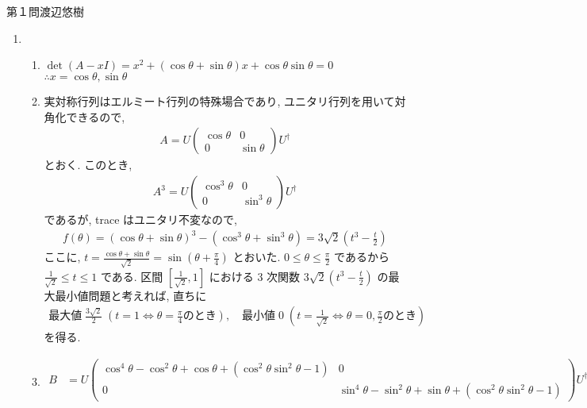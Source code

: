 \def\Tr{\mathop{\mathrm{Tr}}}
\begin{answer}{第１問}{渡辺悠樹}
\begin{enumerate}
\item
  \begin{enumerate}
  \item
    $\det(A-xI) = x^2+ (\cos\theta + \sin\theta)x + \cos\theta\sin\theta = 0$
    $\therefore x = \cos\theta,\sin\theta$
  \item
    実対称行列はエルミート行列の特殊場合であり, ユニタリ行列を用いて対角化できるので,
    \begin{align*}
      A=U\begin{pmatrix}\cos\theta & 0 \\ 0 & \sin\theta\end{pmatrix}U^\dag
    \end{align*}
    とおく. このとき, 
    \begin{align*}
      A^3=U\begin{pmatrix}\cos^3\theta & 0 \\ 0 & \sin^3\theta\end{pmatrix}U^\dag
    \end{align*}
    であるが, trace はユニタリ不変なので,
    \begin{align*}
      f(\theta) =(\cos\theta +\sin\theta)^3 - (\cos^3\theta+\sin^3\theta) =3\sqrt2(t^3-\frac t2)
    \end{align*}
    ここに, $t =\frac{\cos\theta + \sin\theta}{\sqrt2} = \sin\left(\theta +\frac\pi4\right)$
    とおいた. $0\le\theta\le\frac\pi2$
    であるから $\frac1{\sqrt2}\le t\le 1$ である. 区間 $[\frac{1}{\sqrt2}, 1]$ における
    3 次関数 $3\sqrt2(t^3-\frac t2)$ の最大最小値問題と考えれば, 直ちに
    \begin{align*}
      最大値\; \frac{3\sqrt2}{2}\; (t=1 \Leftrightarrow \theta =\frac\pi4 のとき),\quad
      最小値\; 0\; (t=\frac1{\sqrt2} \Leftrightarrow \theta =0, \frac\pi2 のとき)
    \end{align*}
    を得る.
  \item
    \begin{align*}
      B
      &=U\begin{pmatrix}
        \cos^4\theta -\cos^2\theta +\cos\theta +(\cos^2\theta \sin^2\theta - 1) & 0 \\
        0 & \sin^4\theta -\sin^2\theta + \sin\theta + (\cos^2\theta\sin^2\theta -1 )
      \end{pmatrix}U^\dag\\

\end{align*}
\end{enumerate}
\end{enumerate}
\end{answer}
